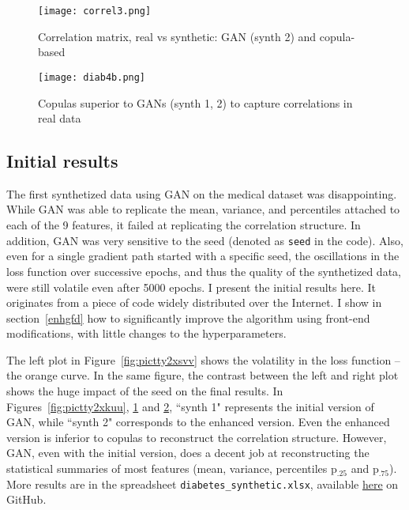 \documentclass[oneside,10pt]{book}
\begin{document}
\begin{figure}[H]
\centering
\texttt{[image: correl3.png]}  
\caption{Correlation matrix, real vs synthetic: GAN (synth 2) and copula-based}
\label{fig:pictty2xsds}
\end{figure}

\begin{figure}[H]
\centering
\texttt{[image: diab4b.png]}  
\caption{Copulas superior to GANs (synth 1, 2) to capture correlations in real data}
\label{fig:pictty2xs}
\end{figure}

\subsection{Initial results}

The first synthetized data using GAN on the medical dataset was disappointing. While GAN was able to replicate the mean, variance,
 and percentiles attached to each of the 9 features, it failed at replicating the correlation structure. In addition, GAN was very sensitive to the \textcolor{index}{seed} (denoted as \texttt{seed} in the code). Also, even for a single gradient path started with a specific seed,   the oscillations in the loss function over successive epochs, and thus the quality of the synthetized data, were still volatile even after 5000 epochs. I present the initial results here. It originates from a piece of code widely distributed over the Internet. 
 I show in section~\ref{enhgfd} how to significantly improve the algorithm using front-end modifications, with little changes to the hyperparameters. 

The left plot in Figure~\ref{fig:pictty2xsvv} shows the volatility in the loss function -- the orange curve. In the same figure, the contrast between the left and right plot shows the huge impact of the seed on the final results. In Figures~\ref{fig:pictty2xkuu}, 
 \ref{fig:pictty2xsds} and \ref{fig:pictty2xs}, ``synth 1" represents the initial version of GAN, while ``synth 2" corresponds to the enhanced version. Even the enhanced version is inferior to copulas to reconstruct the correlation structure. However, GAN, even with the initial version, does a decent job at reconstructing the statistical summaries of most features (mean, variance, percentiles p$_{.25}$ and p$_{.75}$).
 More results are in the spreadsheet \texttt{diabetes\_synthetic.xlsx}, available
 \href{https://github.com/VincentGranville/Main/blob/main/diabetes_synthetic.xlsx}{here} on GitHub.
\end{document}
